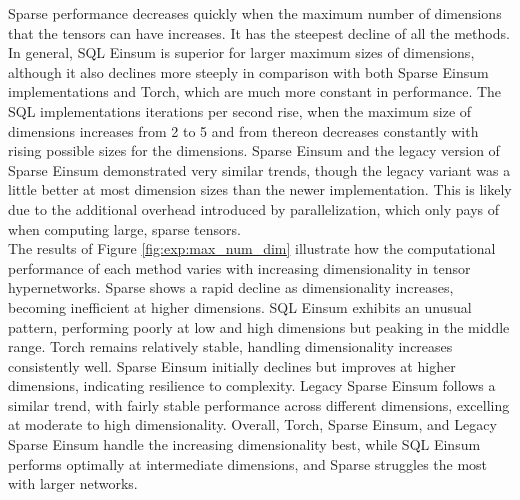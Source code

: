 \noindent
Sparse performance decreases quickly when the maximum number of dimensions that the tensors 
can have increases. It has the steepest decline of all the methods. In general, SQL Einsum is 
superior for larger maximum sizes of dimensions, although it also declines more steeply in 
comparison with both Sparse Einsum implementations and Torch, which are much more constant 
in performance. The SQL implementations iterations per second rise, when the maximum size 
of dimensions increases from 2 to 5 and from thereon decreases constantly with rising possible 
sizes for the dimensions. Sparse Einsum and the legacy version of Sparse Einsum demonstrated 
very similar trends, though the legacy variant was a little better at most dimension sizes 
than the newer implementation. This is likely due to the additional overhead introduced by 
parallelization, which only pays of when computing large, sparse tensors.
\\
The results of Figure \ref{fig:exp:max_num_dim} illustrate how the computational performance 
of each method varies with increasing dimensionality in tensor hypernetworks. Sparse shows a 
rapid decline as dimensionality increases, becoming inefficient at higher dimensions. SQL 
Einsum exhibits an unusual pattern, performing poorly at low and high dimensions but peaking 
in the middle range. Torch remains relatively stable, handling dimensionality increases 
consistently well. Sparse Einsum initially declines but improves at higher dimensions, 
indicating resilience to complexity. Legacy Sparse Einsum follows a similar trend, with fairly 
stable performance across different dimensions, excelling at moderate to high dimensionality. 
Overall, Torch, Sparse Einsum, and Legacy Sparse Einsum handle the increasing dimensionality 
best, while SQL Einsum performs optimally at intermediate dimensions, and Sparse struggles the 
most with larger networks.

